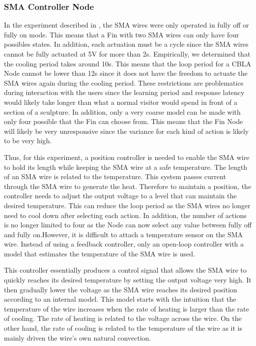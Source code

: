 \subsubsection{SMA Controller Node}

In the experiment described in , the SMA wires were only operated in fully off or fully on mode. This means that a Fin with two SMA wires can only have four possibles states. In addition, each actuation must be a cycle since the SMA wires cannot be fully actuated at 5V for more than 2s. Empirically, we determined that the cooling period takes around 10s. This means that the loop period for a CBLA Node cannot be lower than 12s since it does not have the freedom to actuate the SMA wires again during the cooling period. These restrictions are problematics during interaction with the users since the learning period and response latency would likely take longer than what a normal visitor would spend in front of a section of a sculpture. In addition, only a very coarse model can be made with only four possible that the Fin can choose from. This means that the Fin Node will likely be very unresponsive since the variance for each kind of action is likely to be very high.

Thus, for this experiment, a position controller is needed to enable the SMA wire to hold its length while keeping the SMA wire at a safe temperature. The length of an SMA wire is related to the temperature. This system passes current through the SMA wire to generate the heat. Therefore to maintain a position, the controller needs to adjust the output voltage to a level that can maintain the desired temperature. This can reduce the loop period as the SMA wires no longer need to cool down after selecting each action. In addition, the number of actions is no longer limited to four as the Node can now select any value between fully off and fully on.However, it is difficult to attach a temperature sensor on the SMA wire. Instead of using a feedback controller, only an open-loop controller with a model that estimates the temperature of the SMA wire is used.

This controller essentially produces a control signal that allows the SMA wire to quickly reaches its desired temperature by setting the output voltage very high. It then gradually lower the voltage as the SMA wire reaches its desired position according to an internal model. This model starts with the intuition that the temperature of the wire increases when the rate of heating is larger than the rate of cooling. The rate of heating is related to the voltage across the wire. On the other hand, the rate of cooling is related to the temperature of the wire as it is mainly driven the wire's own natural convection. 

